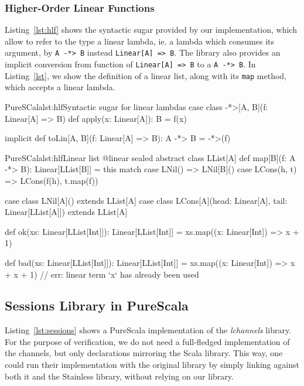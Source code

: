 \documentclass[a4paper,twoside]{article}
\newcommand{\InlineS}[1]{\lstinline[language=PureScala,basicstyle=\small\ttfamily,columns=fixed]|#1|}
\newcommand{\RefCode}[1]{Listing~\ref{#1}}
\newcommand{\stt}[1]{\texttt{\small{#1}}}
\begin{document}
\subsubsection{Higher-Order Linear Functions}

\RefCode{lst:hlf} shows the syntactic sugar provided by our implementation, which allow to refer to the type a linear lambda, ie. a lambda which consumes its argument, by \InlineS{A -*> B} instead \InlineS{Linear[A] => B}. The library also provides an implicit conversion from function of \InlineS{Linear[A] => B} to a \InlineS{A -*> B}.
In \RefCode{lst}, we show the definition of a linear list, along with its \stt{map} method, which accepts a linear lambda.

\begin{Code}{PureSCala}{lst:hlf}{Syntactic sugar for linear lambdas}
case class -*>[A, B](f: Linear[A] => B) {
  def apply(x: Linear[A]): B = f(x)
}

implicit def toLin[A, B](f: Linear[A] => B): A -*> B = -*>(f)
\end{Code}

\begin{Code}{PureSCala}{lst:hlf}{Linear list}
@linear
sealed abstract class LList[A] {
  def map[B](f: A -*> B): Linear[LList[B]] = this match {
    case LNil()      => LNil[B]()
    case LCons(h, t) => LCons(f(h), t.map(f))
  }
}

case class LNil[A]() extends LList[A]
case class LCons[A](head: Linear[A], tail: Linear[LList[A]]) extends LList[A]

def ok(xs: Linear[LList[Int]]): Linear[LList[Int]] = {
  xs.map((x: Linear[Int]) => x + 1)
}

def bad(xs: Linear[LList[Int]]): Linear[LList[Int]] = {
  xs.map((x: Linear[Int]) => x + x + 1) // err: linear term `x` has already been used
}
\end{Code}

\subsection{Sessions Library in PureScala}
\label{sessions_lib}

\RefCode{lst:sessions} shows a PureScala implementation of the \textit{lchannels} library. For the purpose of verification, we do not need a full-fledged implementation of the channels, but only declarations mirroring the Scala library. This way, one could run their implementation with the original library by simply linking against both it and the Stainless library, without relying on our library.
\end{document}
